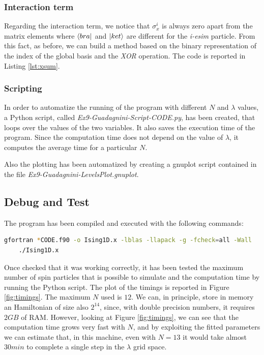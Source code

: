 \documentclass[11pt,a4paper]{article}
\begin{document}
\subsubsection{Interaction term}
Regarding the interaction term, we notice that $\sigma_{x}^{i}$ is always zero apart from the matrix elements where $\bra{bra}$ and $\ket{ket}$ are different for the \textit{i-esim} particle. 
From this fact, as before, we can build a method based on the binary representation of the index of the global basis and the \textit{XOR} operation. The code is reported in Listing \ref{lst:xsum}.


\subsubsection{Scripting}
In order to automatize the running of the program with different $N$ and $\lambda$ values, a Python script, called \textit{Ex9-Guadagnini-Script-CODE.py}, has been created, that loops over the values of the two variables. 
It also saves the execution time of the program. Since the computation time does not depend on the value of $\lambda$, it computes the average time for a particular $N$.

Also the plotting has been automatized by creating a gnuplot script contained in the file \textit{Ex9-Guadagnini-LevelsPlot.gnuplot}.

\subsection{Debug and Test}

The program has been compiled and executed with the following commands:
\begin{lstlisting}[language=BASH,numbers=none]
	gfortran *CODE.f90 -o Ising1D.x -lblas -llapack -g -fcheck=all -Wall
	./Ising1D.x
\end{lstlisting}
Once checked that it was working correctly, it has been tested the maximum number of spin particles that is possible to simulate and the computation time by running the Python script. 
The plot of the timings is reported in Figure \ref{fig:timings}. The maximum $N$ used is $12$. We can, in principle, store in memory an Hamiltonian of size also $2^{14}$, since, with double precision numbers, it requires $2GB$ of RAM. 
However, looking at Figure \ref{fig:timings}, we can see that the computation time grows very fast with $N$, and by exploiting the fitted parameters we can estimate that, in this machine, even with $N=13$ it would take almost $30 min$ to complete a single step in the $\lambda$ grid space.
\end{document}

